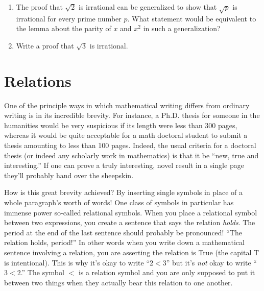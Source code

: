 \documentclass[10pt,]{book}
\theoremstyle{plain}
\theoremstyle{definition}
\theoremstyle{definition}
\numberwithin{equation}{section}
\newcommand{\hint}[1]{ }
\newcommand{\lt}{ < }
\begin{document}
\begin{enumerate}[label=(\alph*)]
          \hint{What if the lemma wasn't true? Can you work out what it would mean if we had a number x such that x2 was even but x itself was odd?}
\item\hypertarget{li-98}{}
          The proof that \(\sqrt{2}\) is irrational can be generalized 
          to show that \(\sqrt{p}\) is irrational for every prime number \(p\).
          What statement would be equivalent to the lemma about the parity
          of \(x\) and \(x^2\) in such a generalization?



          \hint{Hint: Saying ``x is even'' is the same thing as saying ``x is evenly divisible by 2.''  Replace the \(2\) by \(p\) and you're halfway there\dots{}}
\item\hypertarget{li-99}{}
          Write a proof that \(\sqrt{3}\) is irrational.



          \hint{You can mostly just copy the argument for \(\sqrt{2}\).}
\end{enumerate}
\typeout{************************************************}
\typeout{************************************************}
\section[{Relations}]{Relations}\label{sec_rel_intro}

    One of the principle ways in which mathematical writing
    differs from ordinary writing is in its incredible brevity. For
    instance, a Ph.D. thesis for someone in the humanities would be very
    suspicious if its length were less than 300 pages, whereas it would
    be quite acceptable for a math doctoral student to submit a thesis
    amounting to less than 100 pages. Indeed, the usual criteria for
    a doctoral thesis (or indeed any scholarly work in mathematics) is
    that it be ``new, true and interesting.'' If one can prove a truly
    interesting, novel result in a single page \textemdash{} they'll probably hand over
    the sheepskin.
\par

    How is this great brevity achieved? By inserting single symbols in place
    of a whole paragraph's worth of words! One class of symbols in particular
    has immense power \textemdash{} so-called  relational symbols.
    When you place a relational
    symbol between two expressions, you create a sentence that says the
    relation \emph{holds}. The period at the end of the last sentence should
    probably be pronounced! ``The relation holds, period!'' In other words
    when you write down a mathematical sentence involving a relation, you
    are asserting the relation is True (the capital T is intentional).
    This is why it's okay to write ``\(2 \lt  3\)'' but it's \emph{not} okay to
    write ``\(3 \lt  2\).'' The symbol \(\lt\) is a relation symbol and you are
    only supposed to put it between two things when they actually bear this
    relation to one another.
\par
\end{document}
